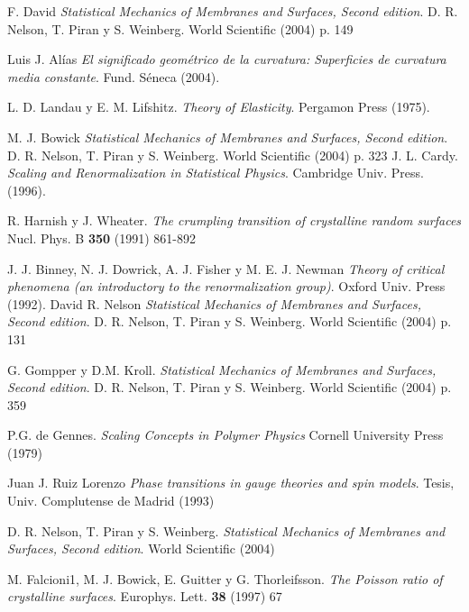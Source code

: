 \begin{thebibliography}{99}
F. David
  \textit{Statistical Mechanics of Membranes and Surfaces, Second edition}.
  D. R. Nelson, T. Piran y S. Weinberg.
  World Scientific (2004) p. 149


Luis J. Alías
  \textit{El significado geométrico de la curvatura: Superficies de curvatura
    media constante}.
  Fund. Séneca (2004).

L. D. Landau y E. M. Lifshitz.
  \textit{Theory of Elasticity}.
  Pergamon Press (1975).

M. J. Bowick
  \textit{Statistical Mechanics of Membranes and Surfaces, Second edition}.
  D. R. Nelson, T. Piran y S. Weinberg.
  World Scientific (2004) p. 323
 J. L. Cardy.
  \textit{Scaling and Renormalization in Statistical Physics}.
  Cambridge Univ. Press. (1996).

R. Harnish y J. Wheater.
  \textit{The crumpling transition of crystalline random surfaces}
Nucl. Phys. B \textbf{350} (1991) 861-892

J. J. Binney, N. J. Dowrick, A. J. Fisher y
  M. E. J. Newman 
  \textit{Theory of critical phenomena (an introductory to the renormalization
    group)}.
  Oxford Univ. Press  (1992).
 David R. Nelson
  \textit{Statistical Mechanics of Membranes and Surfaces, Second edition}.
  D. R. Nelson, T. Piran y S. Weinberg.
  World Scientific (2004) p. 131

G. Gompper y D.M. Kroll.
  \textit{Statistical Mechanics of Membranes and Surfaces, Second edition}.
  D. R. Nelson, T. Piran y S. Weinberg.
  World Scientific (2004) p. 359

 P.G. de Gennes.
   \textit{Scaling Concepts in Polymer Physics}
   Cornell University Press (1979)

 Juan J. Ruiz Lorenzo
    \textit{Phase transitions in gauge theories and spin models}.
    Tesis, Univ. Complutense de Madrid (1993) 

  D. R. Nelson, T. Piran y S. Weinberg. 
  \textit{Statistical Mechanics of Membranes and Surfaces, Second edition}. 
  World Scientific (2004)

 
 M. Falcioni1, M. J. Bowick, E. Guitter y
  G. Thorleifsson.
  \textit{The Poisson ratio of crystalline surfaces}. 
  Europhys. Lett. \textbf{38} (1997) 67


\end{thebibliography}
